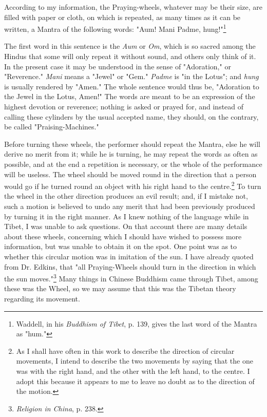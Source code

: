 \documentclass[a4paper, 11pt, oneside, polutonikogreek, english]{article}
\begin{document}
According to my information, the Praying-wheels, whatever may be their size, are filled with paper or cloth, on which is repeated, as many times as it can be written, a Mantra of the following words: "Aum! Mani Padme, hung!"\footnote{Waddell, in his \emph{Buddhism of Tibet}, p. 139, gives the last word of the Mantra as "hum."}

The first word in this sentence is the \emph{Aum} or \emph{Om}, which is so sacred among the Hindus that some will only repeat it without sound, and others only think of it. In the present case it may be understood in the sense of "Adoration," or "Reverence." \emph{Mani} means a "Jewel" or "Gem." \emph{Padme} is "in the Lotus"; and \emph{hung} is usually rendered by "Amen." The whole sentence would thus be, "Adoration to the Jewel in the Lotus, Amen!" The words are meant to be an expression of the highest devotion or reverence; nothing is asked or prayed for, and instead of calling these cylinders by the usual accepted name, they should, on the contrary, be called "Praising-Machines."

Before turning these wheels, the performer should repeat the Mantra, else he will derive no merit from it; while he is turning, he may repeat the words as often as possible, and at the end a repetition is necessary, or the whole of the performance will be useless. The wheel should be moved round in the direction that a person would go if he turned round an object with his right hand to the centre.\footnote{As I shall have often in this work to describe the direction of circular movements, I intend to describe the two movements by saying that the one was with the right hand, and the other  with the left hand, to the centre. I adopt this because it appears to me to leave no doubt as to the direction of the motion.} To turn the wheel in the other direction produces an evil result; and, if I mistake not, such a motion is believed to undo any merit that had been previously produced by turning it in the right manner. As I knew nothing of the language while in Tibet, I was unable to ask questions. On that account there are many details about these wheels, concerning which I should have wished to possess more information, but was unable to obtain it on the spot. One point was as to whether this circular motion was in imitation of the sun. I have already quoted from Dr. Edkins, that "all Praying-Wheels should turn in the direction in which the sun moves."\footnote{\emph{Religion in China}, p. 238.} Many things in Chinese Buddhism came through Tibet, among these was the Wheel, so we may assume that this was the Tibetan theory regarding its movement.
\end{document}

